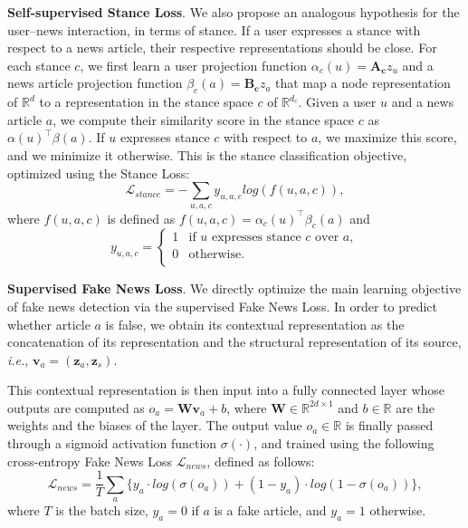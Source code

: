 \documentclass[sigconf]{acmart}
\theoremstyle{definition}
\theoremstyle{hypothesis}
\begin{document}
\textbf{Self-supervised Stance Loss}.
We also propose an analogous hypothesis for the user--news interaction, in terms of stance. If a user expresses a stance with respect to a news article, their respective representations should be close. For each stance $c$, we first learn a user projection function $\alpha_c(u) = \mathbf{A_c} z_u$ and a news article projection function $\beta_c(a) = \mathbf{B_c} z_a$ that map a node representation of $\mathbb{R}^d$ to a representation in the stance space $c$ of $\mathbb{R}^{d_c}$. Given a user $u$ and a news article $a$, we compute their similarity score in the
stance space $c$ as $\alpha(u)^\top \beta(a)$. If $u$ expresses stance $c$ with respect to $a$, we maximize this score, and we minimize it otherwise. This is the stance classification objective, optimized using the Stance Loss: 
\begin{equation}\label{eq:stance_loss}
    \mathcal{L}_{stance} = -\sum_{u,a,c} y_{u,a,c} log(f(u,a,c)), 
\end{equation}
where $f(u,a,c)$ is defined as $f(u,a,c) = \alpha_c(u)^\top \beta_c(a)$ and
\[  y_{u,a,c} = \left\{
\begin{array}{ll}
      1 & \textrm{if } u \textrm{ expresses stance } c \textrm{ over } a, \\
      0 & \textrm{otherwise}. \\
\end{array} 
\right. \]

\textbf{Supervised Fake News Loss}. We directly optimize the main learning objective of fake news detection via the supervised Fake News Loss. In order to predict whether article $a$ is false, we obtain its contextual representation as the concatenation of its representation and the structural representation of its source, {\it i.e.}, $\boldsymbol{v}_a = (\boldsymbol{z}_a, \boldsymbol{z}_s)$. 

This contextual representation is then input into a fully connected layer whose outputs are computed as $o_a = \mathbf{W}\boldsymbol{v}_a+b$, where $\boldsymbol{W}\in \mathbb{R}^{2d\times 1}$ and $b\in \mathbb{R}$ are the weights and the biases of the layer. The output value $o_a \in \mathbb{R}$
is finally passed through a sigmoid activation function $\sigma(\cdot)$, and trained using the following cross-entropy Fake News Loss $\mathcal{L}_{news}$, defined as follows:   
\begin{equation}\label{eq:news_loss}
    \mathcal{L}_{news}=\frac{1}{T}\sum_a\{{y}_{a} \cdot log(\sigma({o}_{a}))+(1-{y}_{a})\cdot log(1-\sigma({o}_{a}))\}, 
\end{equation}
where $T$ is the batch size, $y_{a}=0$ if $a$ is a fake article, and $y_{a}=1$ otherwise.
\end{document}
